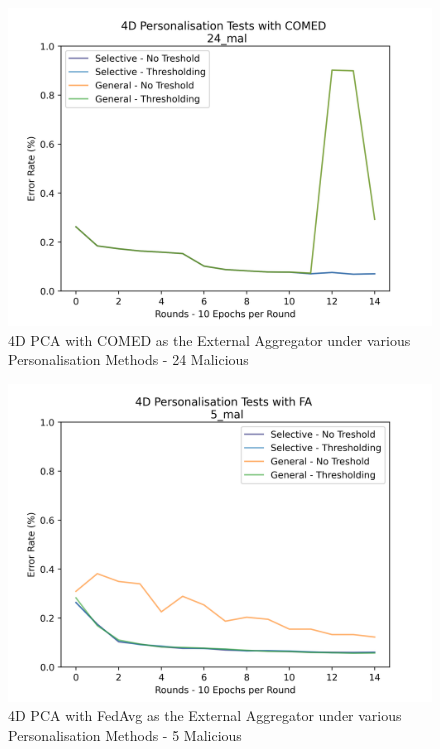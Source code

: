 \begin{figure}[htbp]
	\centering
    \includegraphics[scale=0.5]{my_agg/graphs/comed_4d_24mal.png}
	\caption{4D PCA with COMED as the External Aggregator under various Personalisation Methods - 24 Malicious}
	\label{fig:4d_24mal}
\end{figure}

\begin{figure}[htbp]
	\centering
    \includegraphics[scale=0.5]{my_agg/graphs/fa_4d_5mal.png}
	\caption{4D PCA with FedAvg as the External Aggregator under various Personalisation Methods - 5 Malicious}
	\label{fig:4d_5mal}
\end{figure}

